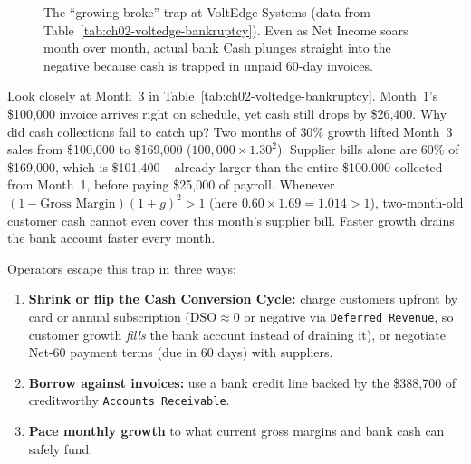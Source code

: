 \begin{figure}[htbp]
\centering
{}
\caption{The ``growing broke'' trap at VoltEdge Systems (data from Table~\ref{tab:ch02-voltedge-bankruptcy}). Even as Net Income soars month over month, actual bank Cash plunges straight into the negative because cash is trapped in unpaid 60-day invoices.}
\label{fig:ch02-growing-broke}
\end{figure}


Look closely at Month~3 in Table~\ref{tab:ch02-voltedge-bankruptcy}. Month~1's \$100,000 invoice arrives right on schedule, yet cash still drops by \$26,400. Why did cash collections fail to catch up? Two months of $30\%$ growth lifted Month~3 sales from \$100,000 to \$169,000 ($100{,}000 \times 1.30^2$). Supplier bills alone are $60\%$ of \$169,000, which is \$101,400 -- already larger than the entire \$100,000 collected from Month~1, before paying \$25,000 of payroll. Whenever $(1 - \text{Gross Margin})(1 + g)^2 > 1$ (here $0.60 \times 1.69 = 1.014 > 1$), two-month-old customer cash cannot even cover this month's supplier bill. Faster growth drains the bank account faster every month.

Operators escape this trap in three ways:
\begin{enumerate}
  \item \textbf{Shrink or flip the Cash Conversion Cycle:} charge customers upfront by card or annual subscription ($\text{DSO} \approx 0$ or negative via \texttt{Deferred Revenue}, so customer growth \emph{fills} the bank account instead of draining it), or negotiate Net-60 payment terms (due in 60 days) with suppliers.
  \item \textbf{Borrow against invoices:} use a bank credit line backed by the \$388,700 of creditworthy \texttt{Accounts Receivable}.
  \item \textbf{Pace monthly growth} to what current gross margins and bank cash can safely fund.
\end{enumerate}


